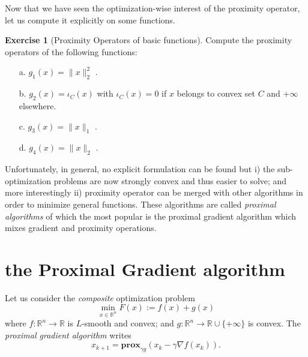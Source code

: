 \documentclass[a4paper,twoside,10pt]{amsart}
\numberwithin{equation}{section} %
\numberwithin{figure}{section} %
\numberwithin{table}{section} %
\theoremstyle{definition}
\newtheorem{q_td}{Exercise }
\begin{document}
\vspace*{0.5cm}

Now that we have seen the optimization-wise interest of the proximity operator, let us compute it explicitly on some functions.

\vspace*{0.5cm}

\begin{q_td}[Proximity Operators of basic functions]
\label{td:fun}
Compute the proximity operators of the following functions:
\begin{itemize}
\item[a.] $g_1(x) = \| x \|_2^2$  .
\item[b.] $g_2(x) = \iota_C(x)$  with $\iota_C(x) = 0$ if $x$ belongs to convex set $C$ and $+\infty$ elsewhere.
\item[c.] $g_3(x) = \|x\|_1 $ . 
\item[d.] $g_4(x) = \|x\|_2 $ . 
\end{itemize}
\end{q_td}

\vspace*{0.5cm}

Unfortunately, in general, no explicit formulation can be found but i) the sub-optimization problems are now strongly convex and thus easier to solve; and more interestingly ii) proximity operator can be merged with other algorithms in order to minimize general functions. These algorithms are called \emph{proximal algorithms} of which the most popular is the proximal gradient algorithm which mixes gradient and proximity operations.

\vspace*{0.5cm}

\section{the Proximal Gradient algorithm}


Let us consider the \emph{composite} optimization problem
$$ \min_{x\in\mathbb{R}^n} F(x) := f(x) + g(x)$$
where $f:\mathbb{R}^n \to \mathbb{R}$ is $L$-smooth and convex; and $g:\mathbb{R}^n \to \mathbb{R}\cup\{+\infty\}$ is convex.  The \emph{proximal gradient algorithm} writes
$$ x_{k+1} = \mathbf{prox}_{\gamma g}\left( x_k - \gamma \nabla f(x_k) \right) . $$
\end{document}
